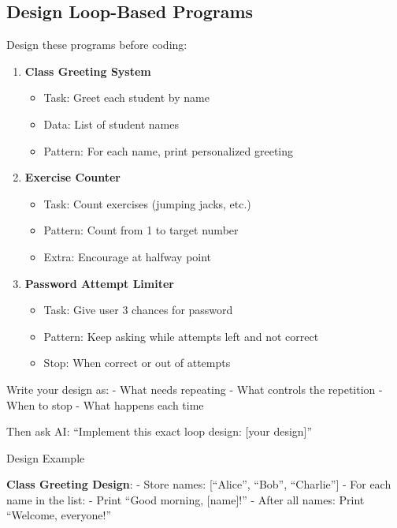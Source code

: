 \documentclass[
  letterpaper,
  DIV=11,
  numbers=noendperiod,
  oneside]{scrreprt}
\providecommand{\tightlist}{%
  \setlength{\itemsep}{0pt}\setlength{\parskip}{0pt}}\usepackage{longtable,booktabs,array}
\begin{document}
\subsection{Design Loop-Based
Programs}\label{design-loop-based-programs}

Design these programs before coding:

\begin{enumerate}
\def\labelenumi{\arabic{enumi}.}
\tightlist
\item
  \textbf{Class Greeting System}

  \begin{itemize}
  \tightlist
  \item
    Task: Greet each student by name
  \item
    Data: List of student names
  \item
    Pattern: For each name, print personalized greeting
  \end{itemize}
\item
  \textbf{Exercise Counter}

  \begin{itemize}
  \tightlist
  \item
    Task: Count exercises (jumping jacks, etc.)
  \item
    Pattern: Count from 1 to target number
  \item
    Extra: Encourage at halfway point
  \end{itemize}
\item
  \textbf{Password Attempt Limiter}

  \begin{itemize}
  \tightlist
  \item
    Task: Give user 3 chances for password
  \item
    Pattern: Keep asking while attempts left and not correct
  \item
    Stop: When correct or out of attempts
  \end{itemize}
\end{enumerate}

Write your design as: - What needs repeating - What controls the
repetition - When to stop - What happens each time

Then ask AI: ``Implement this exact loop design: {[}your design{]}''

Design Example

\textbf{Class Greeting Design}: - Store names: {[}``Alice'', ``Bob'',
``Charlie''{]} - For each name in the list: - Print ``Good morning,
{[}name{]}!'' - After all names: Print ``Welcome, everyone!''
\end{document}
